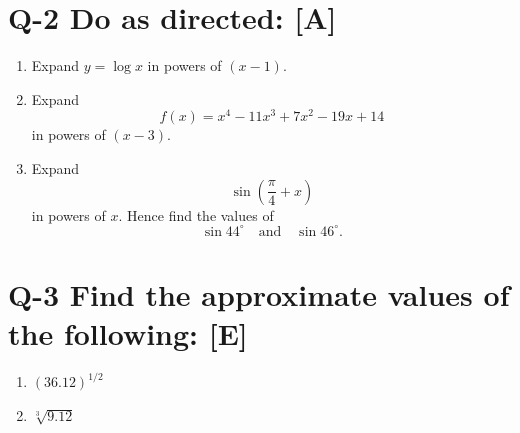 
\section*{Q-2 Do as directed: [A]}
\begin{enumerate}[label=\arabic*.]
  \item Expand $y=\log x$ in powers of $(x-1)$.
  \item Expand
        \[ f(x)=x^{4}-11x^{3}+7x^{2}-19x+14 \]
        in powers of $(x-3)$.
  \item Expand
        \[ \sin\left(\frac{\pi}{4}+x\right) \]
        in powers of $x$. Hence find the values of
        \[ \sin 44^{\circ}\quad\text{and}\quad\sin 46^{\circ}. \]
\end{enumerate}

\section*{Q-3 Find the approximate values of the following: [E]}
\begin{enumerate}[label=\arabic*.]
  \item $(36.12)^{1/2}$
  \item $\sqrt[3]{9.12}$
\end{enumerate}

